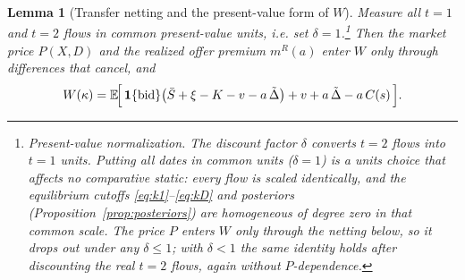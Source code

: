 \documentclass[11pt]{article}
\newtheorem{lemma}{Lemma}
\newcommand{\E}{\mathbb{E}}
\newcommand{\1}{\mathbf{1}}
\begin{document}
\begin{lemma}[Transfer netting and the present-value form of $W$]
\label{lem:transfer-netting}
Measure all $t=1$ and $t=2$ flows in common present-value units, i.e. set
$\delta=1$.\footnote{\label{fn:pv-norm}\emph{Present-value normalization.} The
discount factor $\delta$ converts $t=2$ flows into $t=1$ units. Putting all dates
in common units ($\delta=1$) is a units choice that affects no comparative
static: every flow is scaled identically, and the equilibrium cutoffs
\eqref{eq:k1}--\eqref{eq:kD} and posteriors (Proposition~\ref{prop:posteriors})
are homogeneous of degree zero in that common scale. The price $P$ enters $W$
only through the netting below, so it drops out under any $\delta\le1$; with
$\delta<1$ the same identity holds after discounting the real $t=2$ flows, again
without $P$-dependence.} Then the market price $P(X,D)$ and the realized offer
premium $m^{R}(a)$ enter $W$ only through differences that cancel, and
\begin{equation}
W(\kappa)=\E\!\Big[\,\1\{\textup{bid}\}\big(\bar S+\xi-K-v-a\,\tilde\Delta\big)
   +v+a\,\tilde\Delta-a\,C(s)\,\Big].
\label{eq:welfare-net-d2}
\end{equation}
\end{lemma}
\end{document}
